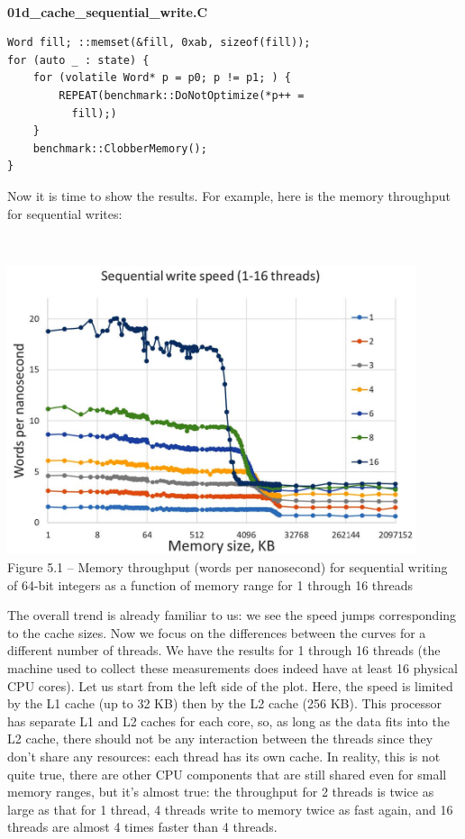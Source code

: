 \hspace*{\fill} \\ %
\noindent
\textbf{01d\_cache\_sequential\_write.C}
\begin{lstlisting}[style=styleCXX]
Word fill; ::memset(&fill, 0xab, sizeof(fill));
for (auto _ : state) {
	for (volatile Word* p = p0; p != p1; ) {
		REPEAT(benchmark::DoNotOptimize(*p++ =
		  fill);)
	}
	benchmark::ClobberMemory();
}
\end{lstlisting}

Now it is time to show the results. For example, here is the memory throughput for sequential writes:

\hspace*{\fill} \\ %
\begin{center}
\includegraphics[width=0.9\textwidth]{content/1/chapter5/images/1.jpg}\\
Figure 5.1 – Memory throughput (words per nanosecond) for sequential writing of 64-bit integers as a function of memory range for 1 through 16 threads
\end{center}

The overall trend is already familiar to us: we see the speed jumps corresponding to the cache sizes. Now we focus on the differences between the curves for a different number of threads. We have the results for 1 through 16 threads (the machine used to collect these measurements does indeed have at least 16 physical CPU cores). Let us start from the left side of the plot. Here, the speed is limited by the L1 cache (up to 32 KB) then by the L2 cache (256 KB). This processor has separate L1 and L2 caches for each core, so, as long as the data fits into the L2 cache, there should not be any interaction between the threads since they don't share any resources: each thread has its own cache. In reality, this is not quite true, there are other CPU components that are still shared even for small memory ranges, but it's almost true: the throughput for 2 threads is twice as large as that for 1 thread, 4 threads write to memory twice as fast again, and 16 threads are almost 4 times faster than 4 threads.

